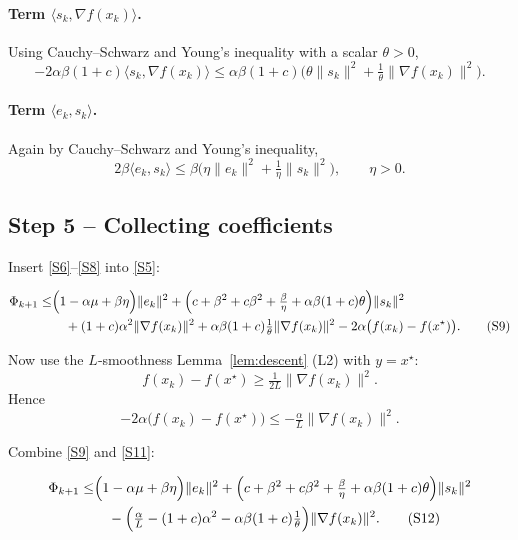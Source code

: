 \documentclass{article}
\begin{document}
\paragraph{Term $\langle s_{k},\nabla f(x_{k})\rangle$.}
Using Cauchy–Schwarz and Young’s inequality with a scalar $\theta>0$,
\begin{equation}
-2\alpha\beta(1+c)\langle s_{k},\nabla f(x_{k})\rangle
\le \alpha\beta(1+c)\bigl(\theta\|s_{k}\|^{2}
      +\tfrac{1}{\theta}\|\nabla f(x_{k})\|^{2}\bigr).
\tag{S7}
\end{equation}

\paragraph{Term $\langle e_{k},s_{k}\rangle$.}
Again by Cauchy–Schwarz and Young’s inequality,
\begin{equation}
2\beta\langle e_{k},s_{k}\rangle
\le \beta\bigl(\eta\|e_{k}\|^{2}+ \tfrac{1}{\eta}\|s_{k}\|^{2}\bigr),
\qquad \eta>0.
\tag{S8}
\end{equation}

\subsection*{Step 5 – Collecting coefficients}
Insert \eqref{S6}–\eqref{S8} into \eqref{S5}:

\begin{align}
\Phi_{k+1}
\le&\Bigl(1-\alpha\mu+\beta\eta\Bigr)\|e_{k}\|^{2}
   +\Bigl(c+\beta^{2}+c\beta^{2}+\tfrac{\beta}{\eta}
          +\alpha\beta(1+c)\theta\Bigr)\|s_{k}\|^{2}\nonumber\\
&\quad +(1+c)\alpha^{2}\|\nabla f(x_{k})\|^{2}
   +\alpha\beta(1+c)\tfrac{1}{\theta}\|\nabla f(x_{k})\|^{2}
   -2\alpha\bigl(f(x_{k})-f(x^{\star})\bigr).
\tag{S9}
\end{align}

Now use the $L$‑smoothness Lemma~\ref{lem:descent} (L2) with $y=x^{\star}$:
\[
f(x_{k})-f(x^{\star})\ge \tfrac{1}{2L}\|\nabla f(x_{k})\|^{2}.
\tag{S10}
\]
Hence
\[
-2\alpha\bigl(f(x_{k})-f(x^{\star})\bigr)
\le -\tfrac{\alpha}{L}\|\nabla f(x_{k})\|^{2}.
\tag{S11}
\]

Combine \eqref{S9} and \eqref{S11}:

\begin{align}
\Phi_{k+1}
\le&\Bigl(1-\alpha\mu+\beta\eta\Bigr)\|e_{k}\|^{2}
   +\Bigl(c+\beta^{2}+c\beta^{2}+\tfrac{\beta}{\eta}
          +\alpha\beta(1+c)\theta\Bigr)\|s_{k}\|^{2}\nonumber\\
&\quad -\Bigl(\tfrac{\alpha}{L}-(1+c)\alpha^{2}
            -\alpha\beta(1+c)\tfrac{1}{\theta}\Bigr)\|\nabla f(x_{k})\|^{2}.
\tag{S12}
\end{align}
\end{document}

